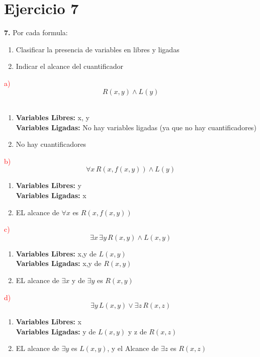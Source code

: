 \chapter*{Ejercicio 7}

\textbf{7.}  Por cada formula: 
\begin{enumerate}
    \item Clasificar la presencia de variables en libres y ligadas
    \item Indicar el alcance del cuantificador
\end{enumerate}
\textcolor{red}{a)} \[ R(x, y) \land L(y) \] \\
\begin{enumerate}
    \item \textbf{Variables Libres:} x, y\\
    \textbf{Variables Ligadas:} No hay variables ligadas (ya que no hay cuantificadores)
    \item No hay cuantificadores
\end{enumerate}

\textcolor{red}{b)} \[ \forall x \, R(x, f(x, y)) \land L(y) \]
\begin{enumerate}
    \item \textbf{Variables Libres:} y \\
    \textbf{Variables Ligadas:} x
    \item EL alcance de $\forall x$ es $R(x, f(x, y))$
\end{enumerate}

\textcolor{red}{c)} \[ \exists x \, \exists y \, R(x, y) \land L(x, y) \]
\begin{enumerate}
    \item \textbf{Variables Libres:} x,y de $L(x, y)$ \\
    \textbf{Variables Ligadas:} x,y de $R(x, y)$
    \item EL alcance de $\exists x$ y de $\exists y$ es $R(x, y)$
\end{enumerate}

\textcolor{red}{d)} \[ \exists y \, L(x, y) \lor \exists z \, R(x, z) \]
\begin{enumerate}
    \item \textbf{Variables Libres:} x\\
    \textbf{Variables Ligadas:} y de $L(x, y)$ y z de $R(x, z)$
    \item EL alcance de  $\exists y$ es $L(x, y)$, y el Alcance de $\exists z$ es $R(x, z)$
\end{enumerate}

